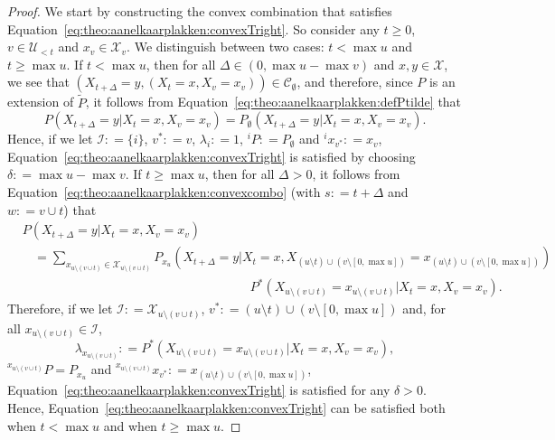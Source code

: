 \documentclass[10pt,a4paper]{paper}
\theoremstyle{definition}
\newcommand{\states}{\mathcal{X}}
\newcommand{\coloneqq}{:\!=}
\begin{document}
\begin{proof}
We start by constructing the convex combination that satisfies Equation~\eqref{eq:theo:aanelkaarplakken:convexTright}. So consider any $t\geq0$, $v\in\mathcal{U}_{<t}$ and $x_v\in\states_v$.
We distinguish between two cases: $t<\max u$ and $t\geq\max u$. If $t<\max u$, then for all $\Delta\in(0,\max u-\max v)$ and $x,y\in\states$, we see that $(X_{t+\Delta}=y,(X_t=x, X_v=x_v))\in\mathcal{C}_\emptyset$, and therefore, since $P$ is an extension of $\tilde{P}$, it follows from Equation~\eqref{eq:theo:aanelkaarplakken:defPtilde} that
\begin{equation*}
P(X_{t+\Delta}=y\vert X_t=x, X_v=x_v)
=P_\emptyset(X_{t+\Delta}=y\vert X_t=x, X_v=x_v).
\end{equation*}
Hence, if we let $\mathcal{I}\coloneqq\{i\}$, $v^*\coloneqq v$, $\lambda_i\coloneqq 1$, ${}^iP\coloneqq P_\emptyset$ and ${}^ix_{v^*}\coloneqq x_v$, Equation~\eqref{eq:theo:aanelkaarplakken:convexTright} is satisfied by choosing $\delta\coloneqq \max u-\max v$.
If $t\geq \max u$, then for all $\Delta>0$, it follows from Equation~\eqref{eq:theo:aanelkaarplakken:convexcombo} (with $s\coloneqq t+\Delta$ and $w\coloneqq v\cup t$) that
\begin{align*}
&P(X_{t+\Delta}=y\vert X_t=x, X_v=x_v)\\
&~~~~=
\sum_{x_{u\setminus(v\cup t)}\in\states_{u\setminus(v\cup t)}}
P_{x_u}(X_{t+\Delta}=y\vert X_t=x, 
X_{(u\setminus t)\cup(v\setminus [0,\max u])}= 
x_{(u\setminus t)\cup(v\setminus [0,\max u])})\\[-4mm]
&\quad\quad\quad\quad\quad\quad\quad\quad\quad\quad\quad\quad\quad\quad\quad\quad\quad\quad
P^*(X_{u\setminus(v\cup t)}=x_{u\setminus(v\cup t)}
\vert X_t=x, X_v=x_v).
\end{align*}
Therefore, if we let $\mathcal{I}\coloneqq\states_{u\setminus(v\cup t)}$, $v^*\coloneqq (u\setminus t)\cup(v\setminus [0,\max u])$ and, for all $x_{u\setminus(v\cup t)}\in \mathcal{I}$,
\begin{equation*}
\lambda_{x_{u\setminus(v\cup t)}}
\coloneqq P^*(X_{u\setminus(v\cup t)}=x_{u\setminus(v\cup t)}
\vert X_t=x, X_v=x_v),
\end{equation*}
${}^{x_{u\setminus(v\cup t)}}P=P_{x_u}$ and ${}^{x_{u\setminus(v\cup t)}}x_{v^*}\coloneqq
x_{(u\setminus t)\cup(v\setminus [0,\max u])}$, Equation~\eqref{eq:theo:aanelkaarplakken:convexTright} is satisfied for any $\delta>0$.
Hence, Equation~\eqref{eq:theo:aanelkaarplakken:convexTright} can be satisfied both when $t<\max u$ and when $t\geq \max u$.


\end{proof}
\end{document}
